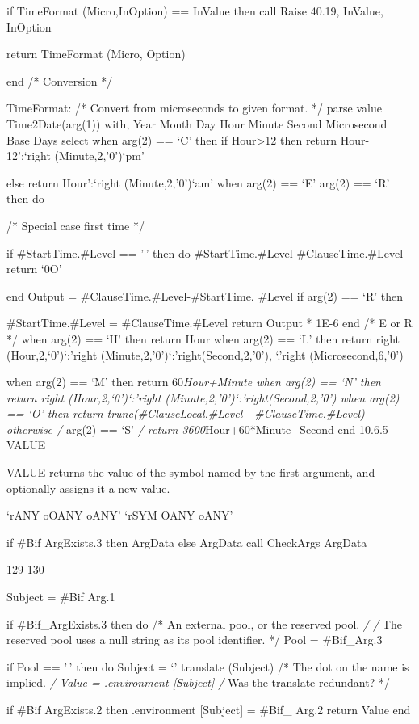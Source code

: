 if TimeFormat (Micro,InOption) == InValue then call Raise 40.19,
InValue, InOption

return TimeFormat (Micro, Option)

end /* Conversion */

TimeFormat: /* Convert from microseconds to given format. */ parse value
Time2Date(arg(1)) with, Year Month Day Hour Minute Second Microsecond
Base Days select when arg(2) == `C' then if Hour\textgreater12 then
return Hour-12':`right (Minute,2,'0')`pm'

else return Hour':`right (Minute,2,'0')`am' when arg(2) == `E'
\textbar{} arg(2) == `R' then do

/* Special case first time */

if \#StartTime.\#Level == '\,' then do \#StartTime.\#Level
\#ClauseTime.\#Level return `0O'

end Output = \#ClauseTime.\#Level-\#StartTime. \#Level if arg(2) == `R'
then

\#StartTime.\#Level = \#ClauseTime.\#Level return Output * 1E-6 end /* E
or R */ when arg(2) == `H' then return Hour when arg(2) == `L' then
return right (Hour,2,`0')`:'right (Minute,2,'0')`:'right(Second,2,'0'),
\textbar\textbar{} `.'right (Microsecond,6,'0')

when arg(2) == `M' then return 60\emph{Hour+Minute when arg(2) == `N'
then return right (Hour,2,`0')`:'right
(Minute,2,'0')`:'right(Second,2,'0') when arg(2) == `O' then return
trunc(\#ClauseLocal.\#Level - \#ClauseTime.\#Level) otherwise /} arg(2)
== `S' \emph{/ return 3600}Hour+60*Minute+Second end 10.6.5 VALUE

VALUE returns the value of the symbol named by the first argument, and
optionally assigns it a new value.

`rANY oOANY oANY' `rSYM OANY oANY'

if \#Bif ArgExists.3 then ArgData else ArgData call CheckArgs ArgData

129 130

Subject = \#Bif Arg.1

if \#Bif\_ArgExists.3 then do /* An external pool, or the reserved pool.
\emph{/ /} The reserved pool uses a null string as its pool identifier.
*/ Pool = \#Bif\_Arg.3

if Pool == '\,' then do Subject = `.' \textbar\textbar{} translate
(Subject) /* The dot on the name is implied. \emph{/ Value =
.environment {[}Subject{]} /} Was the translate redundant? */

if \#Bif ArgExists.2 then .environment {[}Subject{]} = \#Bif\_ Arg.2
return Value end

